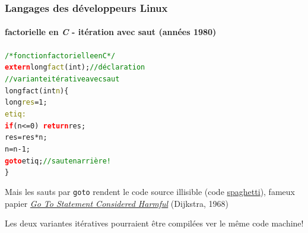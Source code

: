 \documentclass[xcolor=svgnames,final,smaller,a4]{beamer}
\begin{document}
\begin{frame}
  \frametitle{Langages des développeurs Linux}
  \framesubtitle{factorielle en \textit{C} - itération avec saut (années 1980)}

  \begin{alltt}
    \textcolor{green}{/*fonction factorielle en C*/}\\
    \textcolor{red}{\textbf{extern}} long \textcolor{Olive}{fact}(int);  \textcolor{green}{//déclaration}\\
    \textcolor{green}{//variante itérative avec saut}\\
    long fact(int \textcolor{Olive}{n}) \{\\
    \hspace{0.5cm}long \textcolor{Olive}{res} = 1;\\
    \hspace{0.3cm}\textcolor{Olive}{etiq:}\\
    \hspace{0.5cm}\textcolor{red}{\textbf{if}} (n <= 0) ~ \textcolor{red}{\textbf{return}} res;\\
    \hspace{0.5cm} res = res * n;\\
    \hspace{0.5cm} n = n - 1;\\
    \hspace{0.5cm}\textcolor{red}{\textbf{goto}} etiq;  \textcolor{green}{//saut en arrière!}\\
    \}
  \end{alltt}

  Mais les sauts par \texttt{goto} rendent le code source illisible (code
  \href{https://fr.wikipedia.org/wiki/Programmation_spaghetti}{spaghetti}), fameux papier
  \href{https://homepages.cwi.nl/~storm/teaching/reader/Dijkstra68.pdf}{\textit{Go
      To Statement Considered Harmful}} (Dijkstra, 1968)

  Les deux variantes itératives pourraient être compilées ver le même
  code machine!
\end{frame}
\end{document}
